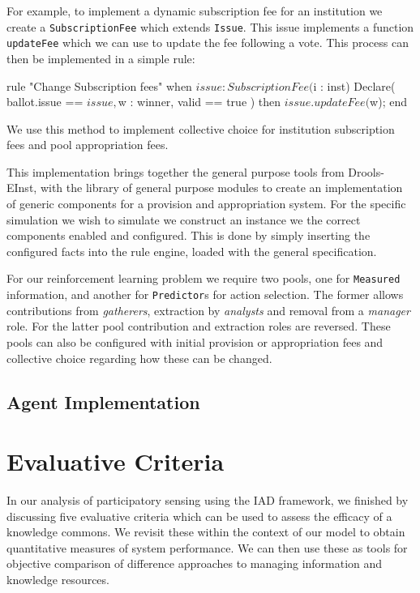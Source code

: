 For example, to implement a dynamic subscription fee for an institution we
create a \texttt{SubscriptionFee} which extends \texttt{Issue}. This issue
implements a function \texttt{updateFee} which we can use to update the fee
following a vote. This process can then be implemented in a simple rule:

\begin{droolsinline}
rule "Change Subscription fees"
	when
		$issue : SubscriptionFee($i : inst)
		Declare( ballot.issue == $issue, $w : winner, valid == true )
	then
		$issue.updateFee($w);
end
\end{droolsinline}

We use this method to implement collective choice for institution subscription
fees and pool appropriation fees.


This implementation brings together the general purpose tools from Drools-
EInst, with the library of general purpose modules to create an implementation
of generic components for a provision and appropriation system. For the
specific simulation we wish to simulate we construct an instance we the
correct components enabled and configured. This is done by simply inserting
the configured facts into the rule engine, loaded with the general
specification.

For our reinforcement learning problem we require two pools, one for
\texttt{Measured} information, and another for \texttt{Predictor}s for action
selection. The former allows contributions from \emph{gatherers}, extraction
by \emph{analysts} and removal from a \emph{manager} role. For the latter pool
contribution and extraction roles are reversed. These pools can also be
configured with initial provision or appropriation fees and collective choice
regarding how these can be changed.

\subsection{Agent Implementation}



\section{Evaluative Criteria}

In our analysis of participatory sensing using the \ac{IAD} framework, we finished by
discussing five evaluative criteria which can be used to assess the efficacy
of a knowledge commons. We revisit these within the context of our model to
obtain quantitative measures of system performance. We can then use these as
tools for objective comparison of difference approaches to managing
information and knowledge resources.

